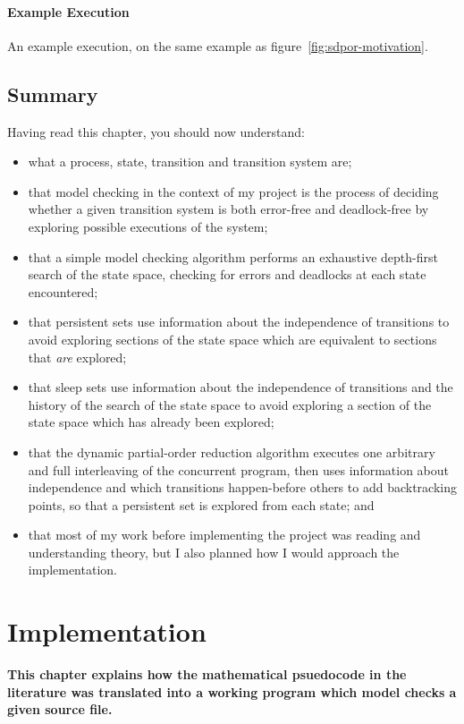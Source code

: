 \documentclass[12pt,a4paper,twoside,openright]{report}
\newenvironment{understandinglist}
	{\begin{itemize} \itemsep 0em}{\end{itemize}}
\begin{document}
\subsubsection{Example Execution}
An example execution, on the same example as
figure~\ref{fig:sdpor-motivation}.

\section{Summary}
Having read this chapter,
you should now understand:
\begin{understandinglist}
	\item what a process, state, transition
	and transition system are;
	\item that model checking in the
	context of my project is the process
	of deciding whether a given transition
	system is both error-free and deadlock-free
	by exploring possible executions of the
	system;
	\item that a simple model checking algorithm
	performs an exhaustive depth-first search
	of the state space, checking for errors and
	deadlocks at each state encountered;
	\item that persistent sets use information
	about the independence of transitions to
	avoid exploring sections of the state space
	which are equivalent to sections that \emph{are}
	explored;
	\item that sleep sets use information about
	the independence of transitions and the history
	of the search of the state space to avoid
	exploring a section of the state space which
	has already been explored;
	\item that the dynamic partial-order
	reduction algorithm executes one arbitrary
	and full interleaving of the concurrent program,
	then uses information about independence and
	which transitions happen-before others to
	add backtracking points, so that a
	persistent set is explored from each state; and
	\item that most of my work before implementing
	the project was reading and understanding theory,
	but I also planned how I would approach the
	implementation.
\end{understandinglist}

\chapter{Implementation}
\textbf{This chapter explains how the mathematical
	psuedocode in the literature was translated
	into a working program which model checks a
	given source file.}
\end{document}
